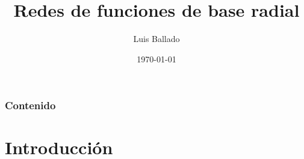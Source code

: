 \documentclass[
	11pt, %
]{beamer}
\title[REDES NEURONALES]{Redes de funciones de base radial} %
\author[Luis Ballado]{Luis Ballado} %
\institute[CINVESTAV]{CINVESTAV - UNIDAD TAMAULIPAS \\ \smallskip \textit{luis.ballado@cinvestav.mx}} %
\date[\today]{\today} %
\begin{document}

\begin{frame}
	\titlepage %
\end{frame}



\begin{frame}
	\frametitle{Contenido} %
	
	\tableofcontents %
\end{frame}


\section{Introducción} %
\end{document}
